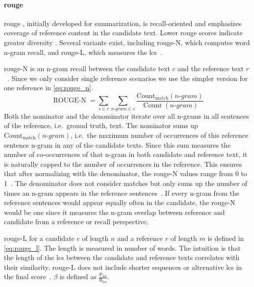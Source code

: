 
\paragraph{\ac{rouge}}
\ac{rouge} \citep{lin_rouge_2004}, initially developed for summarization, is recall-oriented and emphasizes coverage of reference content in the candidate text. 
Lower \ac{rouge} scores indicate greater diversity \citep{kurt_pehlivanoglu_comparative_2024}.
Several variants exist, including \ac{rouge}-N, which computes word n-gram recall, and \ac{rouge}-L, which measures the \ac{lcs}~\citep{zhou_paraphrase_2021,palivela_optimization_2021,kurt_pehlivanoglu_comparative_2024}. 

\ac{rouge}-N is an n-gram recall between the candidate text $c$ and the reference text $r$~\citep{lin_rouge_2004}.
Since we only consider single reference scenarios we use the simpler version for one reference in \autoref{eq:rouge_n}.
\begin{equation}
    \operatorname{ROUGE-N} = \sum_{s \in r}\sum_{n \text{-} gram \in s} \frac{\operatorname{Count_{match}}(n \text{-} gram)}{\operatorname{Count}(n \text{-} gram)}
\label{eq:rouge_n}
\end{equation}
Both the nominator and the denominator iterate over all n-grams in all sentences of the reference, i.e.\ ground truth, text.
The nominator sums up $\operatorname{Count_{match}}(n \text{-} gram)$, i.e.\ the maximum number of occurrences of this reference sentence n-gram in any of the candidate texts.
Since this sum measures the number of co-occurrences of that n-gram in both candidate and reference text, it is naturally capped to the number of occurrences in the reference.
This ensures that after normalizing with the denominator, the \ac{rouge}-N values range from 0 to 1~\citep{kurt_pehlivanoglu_comparative_2024}.
The denominator does not consider matches but only sums up the number of times an n-gram appears in the reference sentences~\citep{lin_rouge_2004}.
If every n-gram from the reference sentences would appear equally often in the candidate, the \ac{rouge}-N would be one since it measures the n-gram overlap between reference and candidate from a reference or recall perspective.

\ac{rouge}-L for a candidate $c$ of length $n$ and a reference $r$ of length $m$ is defined in \autoref{eq:rouge_l}.
The length is measured in number of words.
The intuition is that the length of the \ac{lcs} between the candidate and reference texts correlates with their similarity.
\ac{rouge}-L does not include shorter sequences or alternative \ac{lcs} in the final score~\citep{lin_rouge_2004}.
$\beta$ is defined as $\frac{\mathrm{P_{lcs}}}{\mathrm{R_{lcs}}}$.

